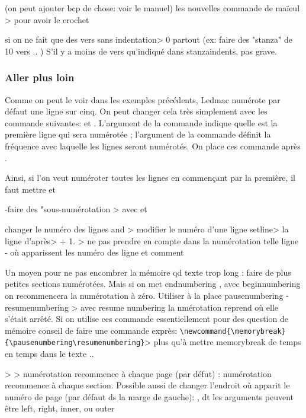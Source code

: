 (on peut ajouter bcp de chose: voir le manuel)
les nouvelles commande de maïeul > pour avoir le crochet

si on ne fait que des vers sans indentation> 0 partout (ex: faire des "stanza" de 10 vers .. ) S'il y a moins de vers qu'indiqué dans stanzaindents, pas grave.

\subsubsection{Aller plus loin}

Comme on peut le voir dans les exemples précédents, Ledmac numérote par défaut  une ligne sur cinq. On peut changer cela très simplement avec les commande suivantes:
 et .
L'argument  de la commande  indique quelle est  la première ligne qui sera numérotée ; l'argument  de la commande  définit la fréquence avec laquelle les lignes seront numérotés. On place ces commande après . 

Ainsi, si l'on veut numéroter toutes les lignes en commençant par la première, il faut mettre  et  




-faire des "sous-numérotation
> avec  
et 

changer le numéro des lignes
 and  > modifier le numéro d'une ligne 
setline> la ligne d'après> + 1.
 > ne pas prendre en compte dans la numérotation telle ligne
-
où apparissent les numéro des ligne et comment

Un moyen pour ne pas encombrer la mémoire qd texte trop long : faire de plus petites sections numérotées. Mais si on met endnumbering ,  avec beginnumbering on recommencera la numérotation à zéro.  Utiliser à la place pausenumbering - resumenumbering > avec resume numbering la nmérotation reprend où elle s'était arrêté. Si on utilise ces commande essentiellement pour des question de mémoire conseil de faire une commande exprès: \verb|\newcommand{\memorybreak}{\pausenumbering\resumenumbering}|> plus qu'à mettre memorybreak de temps en temps dans le texte ..

 >  > numérotation recommence à chaque page  (par défut) : numérotation recommence à chaque section.
Possible aussi de changer l'endroit où apparit le numéro de page (par défaut ds la marge de gauche): , dt les arguments peuvent être left, right, inner, ou outer

